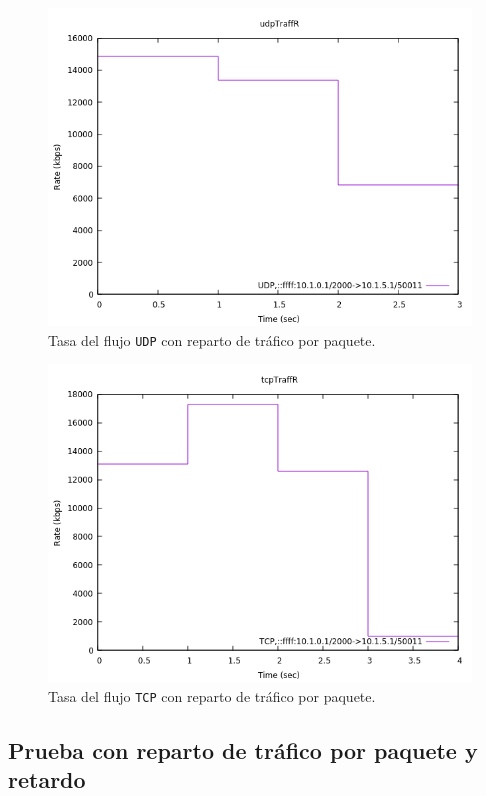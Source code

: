\documentclass[11pt]{article}
\begin{document}
                \begin{figure}
                    \centering
                    \includegraphics[width=0.6\linewidth]{udpTraffPPR.png}
                    \caption{Tasa del flujo \texttt{UDP} con reparto de tráfico por paquete.}
                    \label{fig:udpTraffPPR}
                \end{figure}

                \begin{figure}
                    \centering
                    \includegraphics[width=0.6\linewidth]{tcpTraffPPR.png}
                    \caption{Tasa del flujo \texttt{TCP} con reparto de tráfico por paquete.}
                    \label{fig:tcpTraffPPR}
                \end{figure}

            \subsection{Prueba con reparto de tráfico por paquete y retardo}
                
\end{document}
